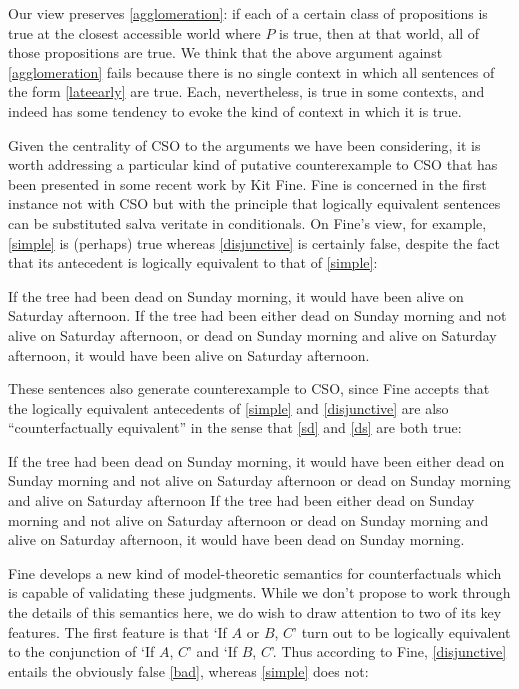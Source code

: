 \documentclass[If.tex]{subfiles}
\begin{document}
Our view preserves \ref{agglomeration}: if each of a certain class of propositions is true at the closest accessible world where $P$ is true, then at that world, all of those propositions are true. We think that the above argument against \ref{agglomeration} fails because there is no single context in which all sentences of the form \ref{lateearly} are true. Each, nevertheless, is true in some contexts, and indeed has some tendency to evoke the kind of context in which it is true.%


Given the centrality of CSO to the arguments we have been considering, it is worth addressing a particular kind of putative counterexample to CSO that has been presented in some recent work by Kit Fine. Fine is concerned in the first instance not with CSO but with the principle that logically equivalent sentences can be substituted salva veritate in conditionals. On Fine's view, for example, \ref{simple} is (perhaps) true whereas \ref{disjunctive} is certainly false, despite the fact that its antecedent is logically equivalent to that of \ref{simple}:
\begin{prop}
	\nitem \label{simple}
		If the tree had been dead on Sunday morning, it would have been alive on Saturday afternoon.
	\nitem \label{disjunctive}
		If the tree had been either dead on Sunday morning and not alive on Saturday afternoon, or dead on Sunday morning and alive on Saturday afternoon, it would have been alive on Saturday afternoon.
\end{prop}
These sentences also generate counterexample to CSO, since Fine accepts that the logically equivalent antecedents of \ref{simple} and \ref{disjunctive} are also “counterfactually equivalent” in the sense that \ref{sd} and \ref{ds} are both true:
\begin{prop}
	\nitem \label{sd}
		If the tree had been dead on Sunday morning, it would have been either dead on Sunday morning and not alive on Saturday afternoon or dead on Sunday morning and alive on Saturday afternoon
	\nitem \label{ds}
		If the tree had been either dead on Sunday morning and not alive on Saturday afternoon or dead on Sunday morning and alive on Saturday afternoon, it would have been dead on Sunday morning.
\end{prop}
Fine develops a new kind of model-theoretic semantics for counterfactuals which is capable of validating these judgments. While we don't propose to work through the details of this semantics here, we do wish to draw attention to two of its key features. The first feature is that ‘If $A$ or $B$, $C$’ turn out to be logically equivalent to the conjunction of ‘If $A$, $C$’ and ‘If $B$, $C$’. Thus according to Fine, \ref{disjunctive} entails the obviously false \ref{bad}, whereas \ref{simple} does not:
\end{document}
